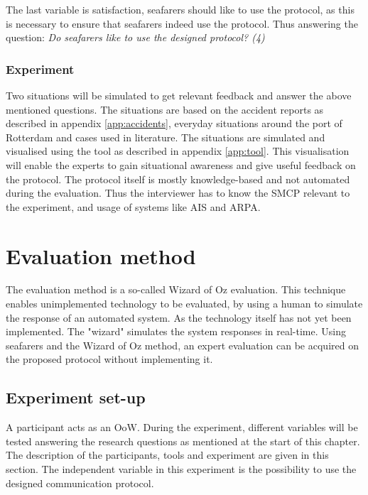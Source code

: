The last variable is satisfaction, seafarers should like to use the protocol, as this is necessary to ensure that seafarers indeed use the protocol. Thus answering the question: \emph{Do seafarers like to use the designed protocol? (4)}


\subsubsection{Experiment}
Two situations will be simulated to get relevant feedback and answer the above mentioned questions. The situations are based on the accident reports as described in appendix \ref{app:accidents}, everyday situations around the port of Rotterdam and cases used in literature. The situations are simulated and visualised using the tool as described in appendix \ref{app:tool}. This visualisation will enable the experts to gain situational awareness and give useful feedback on the protocol. The protocol itself is mostly knowledge-based and not automated during the evaluation. Thus the interviewer has to know the \acf{SMCP} relevant to the experiment, and usage of systems like \acf{AIS} and \acf{ARPA}.


\section{Evaluation method}
The evaluation method is a so-called Wizard of Oz evaluation. This technique enables unimplemented technology to be evaluated, by using a human to simulate the response of an automated system. As the technology itself has not yet been implemented. The "wizard" simulates the system responses in real-time. Using seafarers and the Wizard of Oz method, an expert evaluation can be acquired on the proposed protocol without implementing it.

\subsection{Experiment set-up}
A participant acts as an \acf{OoW}. During the experiment, different variables will be tested answering the research questions as mentioned at the start of this chapter. The description of the participants, tools and experiment are given in this section. The independent variable in this experiment is the possibility to use the designed communication protocol.

